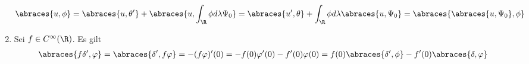 \begin{solution}
\begin{enumerate}[label = (\roman*)]
	\begin{align*}
	\abraces{u, \phi} = \abraces{u, \theta^\prime} + \abraces{u, \int_\R \phi d\lambda \Psi_0} = \abraces{u^\prime, \theta} + \int_\R \phi d\lambda \abraces{u, \Psi_0} = \abraces{\abraces{u, \Psi_0}, \phi}
	\end{align*}
	\item Sei $f \in C^\infty(\R)$. Es gilt
	\begin{align*}
	\abraces{f \delta^\prime, \varphi} = \abraces{\delta^\prime, f\varphi} = - (f\varphi)^\prime (0) = -f(0) \varphi^\prime(0) - f^\prime(0) \varphi(0) = f(0) \abraces{\delta^\prime, \phi} - f^\prime(0) \abraces{\delta, \varphi}
	\end{align*}
\end{enumerate}

\end{solution}

